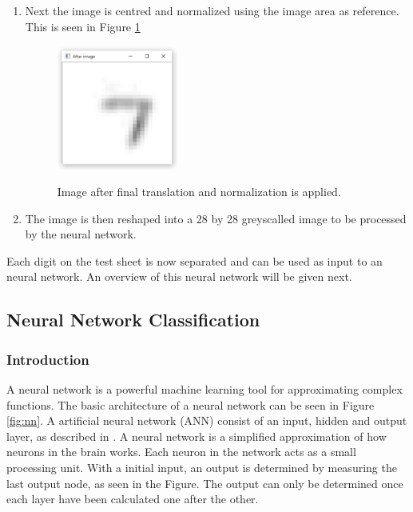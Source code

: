 \begin{enumerate}
\item Next the image is centred and normalized using the image area as reference. This is seen in Figure \ref{fig:final}

\begin{figure}
  \centering
  \includegraphics[width=4cm]{TranslateAndScale}\\
  \caption{Image after final translation and normalization is applied.}
  \label{fig:final}
\end{figure}

\item The image is then reshaped into a 28 by 28 greyscalled image to be processed by the neural network.
\end{enumerate}

Each digit on the test sheet is now separated and can be used as input to an neural network. An overview of this neural network will be given next.

\subsection{Neural Network Classification}

\subsubsection{Introduction}

A neural network is a powerful machine learning tool for approximating complex functions. The basic architecture of a neural network can be seen in Figure \ref{fig:nn}. A artificial neural network (ANN) consist of an input, hidden and output layer, as described in \citet{MichealN2015}. A neural network is a simplified approximation of how neurons in the brain works. Each neuron in the network acts as a small processing unit. With a initial input, an output is determined by measuring the last output node, as seen in the Figure. The output can only be determined once each layer have been calculated one after the other.

